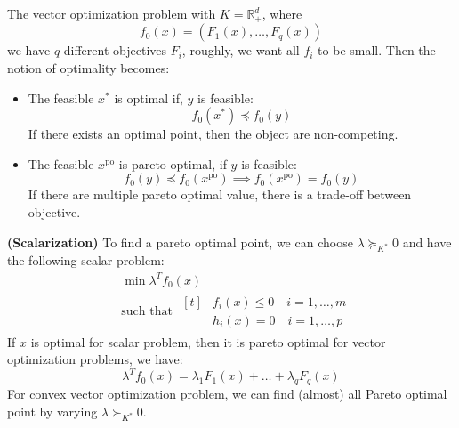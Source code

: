 \begin{remark}
    The vector optimization problem with $K = \mathbb{R}^d_+$, where 
    \begin{equation*}
        f_0(x) = (F_1(x),\dots,F_q(x))
    \end{equation*}
    we have $q$ different objectives $F_i$, roughly, we want all $f_i$ to be small. Then the notion of optimality becomes:
    \begin{itemize}
        \item The feasible $x^*$ is optimal if, $y$ is feasible:
        \begin{equation*}
            f_0(x^*) \preceq f_0(y)
        \end{equation*}
        If there exists an optimal point, then the object are non-competing.
        \item The feasible $x^\text{po}$ is pareto optimal, if $y$ is feasible:
        \begin{equation*}
            f_0(y)\preceq f_0(x^\text{po}) \implies f_0(x^\text{po}) = f_0(y)
        \end{equation*}
        If there are multiple pareto optimal value, there is a trade-off between objective.
    \end{itemize}
\end{remark}

\begin{definition}{\textbf{(Scalarization)}}
    To find a pareto optimal point, we can choose $\lambda\succeq_{K^*}0$ and have the following scalar problem:
    \begin{equation*}
    \begin{aligned}
        &\min \lambda^Tf_0(x) \\
        &\text{such that } \begin{aligned}[t]
            &f_i(x)\le0 \quad i=1,\dots,m \\
            &h_i(x)=0 \quad i=1,\dots,p
        \end{aligned}
    \end{aligned}
    \end{equation*}
    If $x$ is optimal for scalar problem, then it is pareto optimal for vector optimization problems, we have:
    \begin{equation*}
        \lambda^Tf_0(x) = \lambda_1F_1(x) + \dots + \lambda_qF_q(x)
    \end{equation*}
    For convex vector optimization problem, we can find (almost) all Pareto optimal point by varying $\lambda\succ_{K^*}0$. 
\end{definition}

